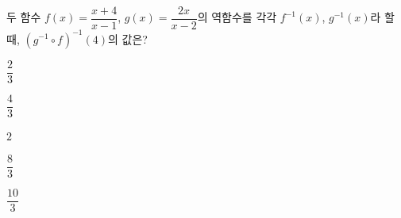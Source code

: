 \hspace*{2mm}\begin{minipage}[t]{\dimexpr\linewidth-2mm\relax}\vspace{0pt}
두 함수 $f(x)=\dfrac{x+4}{x-1}$, $g(x)=\dfrac{2x}{x-2}$의 역함수를 각각 $f^{-1}(x)$, $g^{-1}(x)$라 할 때, $(g^{-1}\circ f)^{-1}(4)$의 값은?
\begin{choices32}{\rule[-3ex]{0pt}{8ex}$\dfrac{2}{3}$}{\rule[-3ex]{0pt}{8ex}$\dfrac{4}{3}$}{\rule[-3ex]{0pt}{8ex}$2$}{\rule[-3ex]{0pt}{8ex}$\dfrac{8}{3}$}{\rule[-3ex]{0pt}{8ex}$\dfrac{10}{3}$}\end{choices32}\end{minipage}
